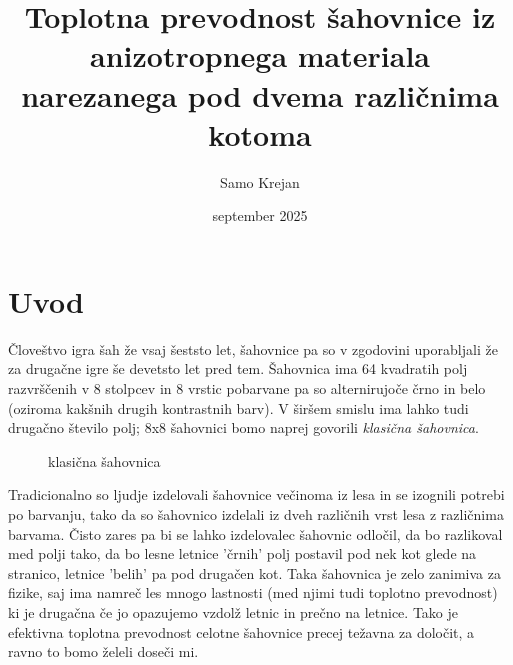 \documentclass[12pt]{article}
\title{\textbf{Toplotna prevodnost šahovnice iz anizotropnega materiala narezanega pod dvema različnima kotoma}}
\author{Samo Krejan}
\date{september 2025}
\begin{document}
\maketitle

\section{Uvod}

Človeštvo igra šah že vsaj šeststo let, šahovnice pa so v zgodovini uporabljali že za drugačne igre še devetsto let pred tem. Šahovnica ima 64 kvadratih polj razvrščenih v 8 stolpcev in 8 vrstic pobarvane pa so alternirujoče črno in belo (oziroma kakšnih drugih kontrastnih barv). V širšem smislu ima lahko tudi drugačno število polj; 8x8 šahovnici bomo naprej govorili \textit{klasična šahovnica}.


\begin{figure}[htbp]
  \centering

  \caption{klasična šahovnica}
  \label{fig:classical_chessboard}
\end{figure}

Tradicionalno so ljudje izdelovali šahovnice večinoma iz lesa in se izognili potrebi po barvanju, tako da so šahovnico izdelali iz dveh različnih vrst lesa z različnima barvama. Čisto zares pa bi se lahko izdelovalec šahovnic odločil, da bo razlikoval med polji tako, da bo lesne letnice 'črnih' polj postavil pod nek kot glede na stranico, letnice 'belih' pa pod drugačen kot. Taka šahovnica je zelo zanimiva za fizike, saj ima namreč les mnogo lastnosti (med njimi tudi toplotno prevodnost) ki je drugačna če jo opazujemo vzdolž letnic in prečno na letnice. Tako je efektivna toplotna prevodnost celotne šahovnice precej težavna za določit, a ravno to bomo želeli doseči mi.
\end{document}
